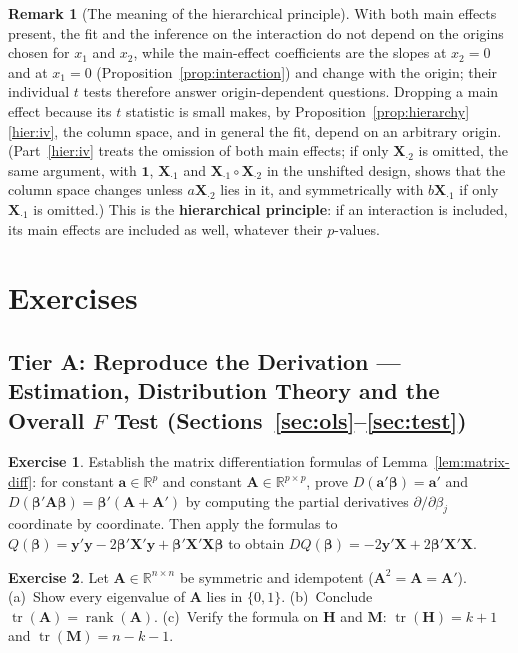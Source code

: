 \documentclass[12pt,a4paper]{article}
\theoremstyle{definition}
\newtheorem{remark}[theorem]{Remark}
\newtheorem{exercise}{Exercise}
\newcommand{\extier}{}
\newcommand{\exercisetier}[1]{\renewcommand{\extier}{#1}\setcounter{exercise}{0}}
\DeclareMathOperator\tr{tr}
\DeclareMathOperator\rank{rank}
\newcommand{\bX}{\mathbf{X}}
\newcommand{\by}{\mathbf{y}}
\def\bb{\boldsymbol{\beta}}
\newcommand{\bH}{\mathbf{H}}
\newcommand{\bM}{\mathbf{M}}
\newcommand{\bone}{\mathbf{1}}
\newcommand{\bA}{\mathbf{A}}
\newcommand{\ba}{\mathbf{a}}
\newcommand{\Real}{\mathbb{R}}
\begin{document}
\begin{remark}[The meaning of the hierarchical principle]\label{rem:hierarchy}
With both main effects present, the fit and the inference on the interaction do not depend on the origins chosen for $x_1$ and $x_2$, while the main-effect coefficients are the slopes at $x_2 = 0$ and at $x_1 = 0$ (Proposition~\ref{prop:interaction}) and change with the origin; their individual $t$ tests therefore answer origin-dependent questions. Dropping a main effect because its $t$ statistic is small makes, by Proposition~\ref{prop:hierarchy}\ref{hier:iv}, the column space, and in general the fit, depend on an arbitrary origin. (Part~\ref{hier:iv} treats the omission of both main effects; if only $\bX_{\cdot 2}$ is omitted, the same argument, with $\bone$, $\bX_{\cdot 1}$ and $\bX_{\cdot 1} \circ \bX_{\cdot 2}$ in the unshifted design, shows that the column space changes unless $a\bX_{\cdot 2}$ lies in it, and symmetrically with $b\bX_{\cdot 1}$ if only $\bX_{\cdot 1}$ is omitted.) This is the \textbf{hierarchical principle}: if an interaction is included, its main effects are included as well, whatever their $p$-values.
\end{remark}

\section{Exercises}

\exercisetier{A}
\subsection*{Tier A: Reproduce the Derivation --- Estimation, Distribution Theory and the Overall $F$ Test (Sections~\ref{sec:ols}--\ref{sec:test})}

\begin{exercise}\label{ex:A1}
Establish the matrix differentiation formulas of Lemma~\ref{lem:matrix-diff}: for constant $\ba\in\Real^p$ and constant $\bA\in\Real^{p\times p}$, prove $D(\ba'\bb)=\ba'$ and $D(\bb'\bA\bb)=\bb'(\bA+\bA')$ by computing the partial derivatives $\partial/\partial\beta_j$ coordinate by coordinate. Then apply the formulas to $Q(\bb) = \by'\by - 2\bb'\bX'\by + \bb'\bX'\bX\bb$ to obtain $DQ(\bb) = -2\by'\bX + 2\bb'\bX'\bX$.
\end{exercise}

\begin{exercise}\label{ex:A2}
Let $\bA\in\Real^{n\times n}$ be symmetric and idempotent ($\bA^2=\bA=\bA'$). (a)~Show every eigenvalue of $\bA$ lies in $\{0,1\}$. (b)~Conclude $\tr(\bA)=\rank(\bA)$. (c)~Verify the formula on $\bH$ and $\bM$: $\tr(\bH)=k+1$ and $\tr(\bM)=n-k-1$.
\end{exercise}
\end{document}
